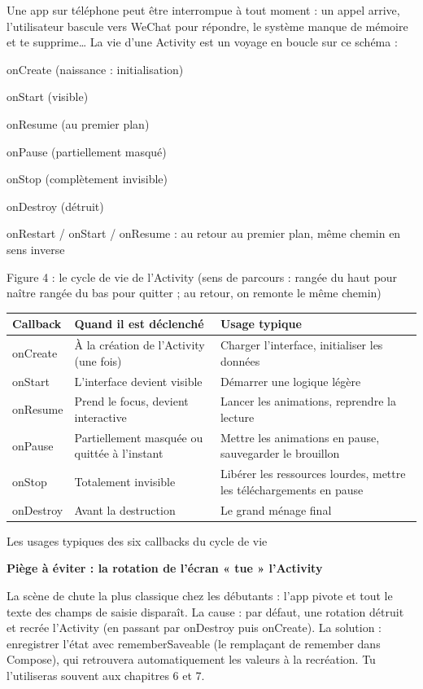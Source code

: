 Une app sur téléphone peut être interrompue à tout moment : un appel arrive, l'utilisateur bascule vers WeChat pour répondre, le système manque de mémoire et te supprime… La vie d'une Activity est un voyage en boucle sur ce schéma :

onCreate (naissance : initialisation)

onStart (visible)

onResume (au premier plan)

onPause (partiellement masqué)

onStop (complètement invisible)

onDestroy (détruit)

onRestart / onStart / onResume : au retour au premier plan, même chemin en sens inverse

\begin{center}\small\color{gray}Figure 4 : le cycle de vie de l'Activity (sens de parcours : rangée du haut pour naître rangée du bas pour quitter ; au retour, on remonte le même chemin)\end{center}

\begin{center}
\begin{tabularx}{\linewidth}{|X|X|X|}
\hline
\textbf{Callback} & \textbf{Quand il est déclenché} & \textbf{Usage typique} \tabularnewline
\hline
onCreate & À la création de l'Activity (une fois) & Charger l'interface, initialiser les données \tabularnewline
onStart & L'interface devient visible & Démarrer une logique légère \tabularnewline
onResume & Prend le focus, devient interactive & Lancer les animations, reprendre la lecture \tabularnewline
onPause & Partiellement masquée ou quittée à l'instant & Mettre les animations en pause, sauvegarder le brouillon \tabularnewline
onStop & Totalement invisible & Libérer les ressources lourdes, mettre les téléchargements en pause \tabularnewline
onDestroy & Avant la destruction & Le grand ménage final \tabularnewline
\hline
\end{tabularx}
\end{center}

\begin{center}\small\color{gray}Les usages typiques des six callbacks du cycle de vie\end{center}

\textbf{Piège à éviter : la rotation de l'écran « tue » l'Activity}\par

La scène de chute la plus classique chez les débutants : l'app pivote et tout le texte des champs de saisie disparaît. La cause : par défaut, une rotation détruit et recrée l'Activity (en passant par onDestroy puis onCreate). La solution : enregistrer l'état avec rememberSaveable (le remplaçant de remember dans Compose), qui retrouvera automatiquement les valeurs à la recréation. Tu l'utiliseras souvent aux chapitres 6 et 7.

